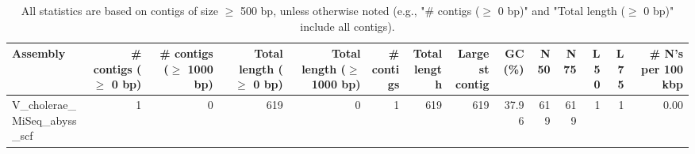 \documentclass[12pt,a4paper]{article}
\begin{document}
\begin{table}[ht]
\begin{center}
\caption{All statistics are based on contigs of size $\geq$ 500 bp, unless otherwise noted (e.g., "\# contigs ($\geq$ 0 bp)" and "Total length ($\geq$ 0 bp)" include all contigs).}
\begin{tabular}{|l*{13}{|r}|}
\hline
Assembly & \# contigs ($\geq$ 0 bp) & \# contigs ($\geq$ 1000 bp) & Total length ($\geq$ 0 bp) & Total length ($\geq$ 1000 bp) & \# contigs & Total length & Largest contig & GC (\%) & N50 & N75 & L50 & L75 & \# N's per 100 kbp \\ \hline
V\_cholerae\_MiSeq\_abyss\_scf & 1 & 0 & 619 & 0 & 1 & 619 & 619 & 37.96 & 619 & 619 & 1 & 1 & 0.00 \\ \hline
\end{tabular}
\end{center}
\end{table}
\end{document}
